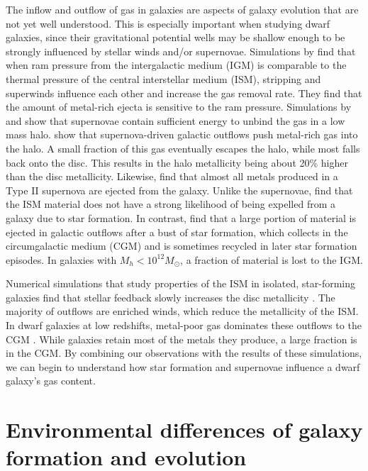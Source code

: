The inflow and outflow of gas in galaxies are aspects of galaxy evolution that 
are not yet well understood.  This is especially important when studying dwarf 
galaxies, since their gravitational potential wells may be shallow enough to be 
strongly influenced by stellar winds and/or supernovae.  Simulations by 
\cite{Marcolini04} find that when ram pressure from the intergalactic medium 
(IGM) is comparable to the thermal pressure of the central interstellar medium 
(ISM), stripping and superwinds influence each other and increase the gas 
removal rate.  They find that the amount of metal-rich ejecta is sensitive to 
the ram pressure.  
Simulations by \cite{Power14} and \cite{Melioli15} show that supernovae contain 
sufficient energy to unbind the gas in a low mass halo.  \cite{Hu16} show that 
supernova-driven galactic outflows push metal-rich gas into the halo.  A small 
fraction of this gas eventually escapes the halo, while most falls back onto the 
disc.  This results in the halo metallicity being about 20\% higher than the 
disc metallicity.  Likewise, \cite{Muratov17} find that almost all metals 
produced in a Type II supernova are ejected from the galaxy.
Unlike the supernovae, \cite{Melioli15} find that the ISM material does not have 
a strong likelihood of being expelled from a galaxy due to star formation.  In 
contrast, \cite{Muratov15} find that a large portion of material is ejected in 
galactic outflows after a bust of star formation, which collects in the 
circumgalactic medium (CGM) and is sometimes recycled in later star formation 
episodes.  In galaxies with $M_h < 10^{12} M_\odot$, a fraction of material is 
lost to the IGM.

Numerical simulations that study properties of the ISM in isolated, star-forming 
galaxies find that stellar feedback slowly increases the disc metallicity 
\citep{Hu16}.  The majority of outflows are enriched winds, which reduce the 
metallicity of the ISM.  In dwarf galaxies at low redshifts, metal-poor gas 
dominates these outflows to the CGM \citep{Muratov17}.  While galaxies retain 
most of the metals they produce, a large fraction is in the CGM.  By combining 
our observations with the results of these simulations, we can begin to 
understand how star formation and supernovae influence a dwarf galaxy's gas 
content.


\section[Environmental differences]{Environmental differences of galaxy formation and evolution}

